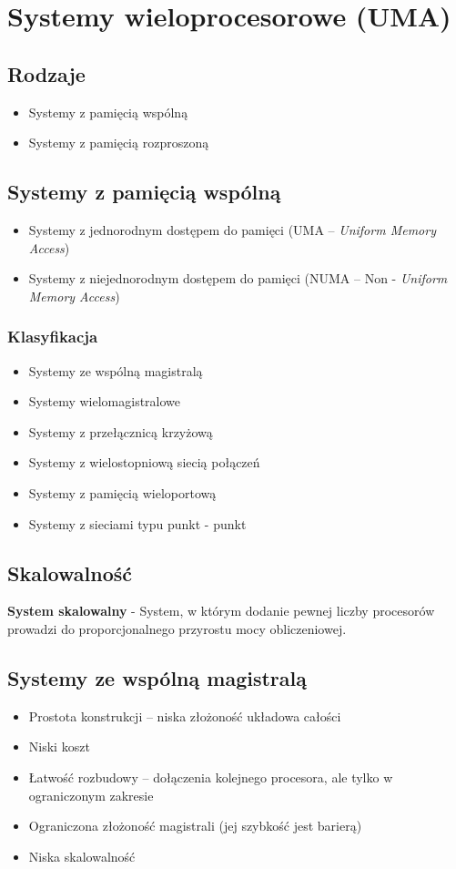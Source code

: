\section{Systemy wieloprocesorowe (UMA)}
\begin{samepage}
	\subsection{Rodzaje}
		\begin{itemize}
			\item Systemy z pamięcią wspólną
			\item Systemy z pamięcią rozproszoną
		\end{itemize}
	\subsection{Systemy z pamięcią wspólną}
		\begin{itemize}
			\item Systemy z jednorodnym dostępem do pamięci (UMA – \emph{Uniform Memory Access})
			\item Systemy z niejednorodnym dostępem do pamięci (NUMA – Non 	- \emph{Uniform Memory Access})
		\end{itemize}
\end{samepage}
		\subsubsection{Klasyfikacja} \label{subsubsec:klasyfikacjaUMA}
			\begin{itemize}
				\item Systemy ze wspólną magistralą
				\item Systemy wielomagistralowe
				\item Systemy z przełącznicą krzyżową
				\item Systemy z wielostopniową siecią połączeń
				\item Systemy z pamięcią wieloportową
				\item Systemy z sieciami typu punkt - punkt
			\end{itemize}
	\subsection{Skalowalność}
		\textbf{System skalowalny} - System, w którym dodanie pewnej liczby procesorów prowadzi do proporcjonalnego przyrostu mocy obliczeniowej.
	\subsection{Systemy ze wspólną magistralą}
		\begin{itemize}
			\item Prostota konstrukcji – niska złożoność układowa całości
			\item Niski koszt
			\item Łatwość rozbudowy – dołączenia kolejnego procesora, ale tylko w ograniczonym zakresie
			\item Ograniczona złożoność magistrali (jej szybkość jest barierą)
			\item Niska skalowalność
		\end{itemize}
